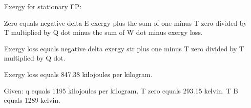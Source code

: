 Exergy for stationary FP:  

Zero equals negative delta E exergy plus the sum of one minus T zero divided by T multiplied by Q dot minus the sum of W dot minus exergy loss.  

Exergy loss equals negative delta exergy str plus one minus T zero divided by T multiplied by Q dot.  

Exergy loss equals 847.38 kilojoules per kilogram.  

Given:  
q equals 1195 kilojoules per kilogram.  
T zero equals 293.15 kelvin.  
T B equals 1289 kelvin.
